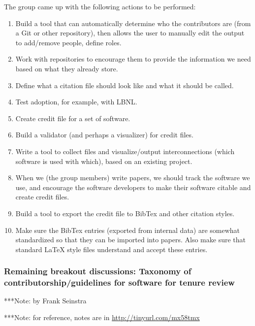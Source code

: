 \documentclass[11pt, oneside]{amsart}
\newcommand{\note}[1]{ {\textcolor{blueish}    { ***Note:      #1 }}}
\begin{document}
The group came up with the following actions to be performed:
\begin{enumerate}
\item Build a tool that can automatically determine who the contributors are
(from a Git or other repository), then allows the user to manually edit the output to
add/remove people, define roles.
\item Work with repositories to encourage them to provide the information we
need based on what they already store.
\item Define what a citation file should look like and what it should be called.
\item Test adoption, for example, with LBNL.
\item Create credit file for a set of software.
\item Build a validator (and perhaps a visualizer) for credit files.
\item Write a tool to collect files and visualize/output interconnections (which
software is used with which), based on an existing project.
\item When we (the group members) write papers, we should track the software
we use, and encourage the software developers to make their software citable
and create credit files.
\item Build a tool to export the credit file to BibTex and other citation styles.
\item Make sure the BibTex entries (exported from internal data) are somewhat
standardized so that they can be imported into papers.  Also make sure that
standard LaTeX style files understand and accept these entries.
\end{enumerate}


\subsubsection{Remaining breakout discussions: Taxonomy of contributorship/guidelines for software for tenure review}
\note{by Frank Seinstra}

\note{for reference, notes are in \url{http://tinyurl.com/mx58tmx}}
\end{document}
